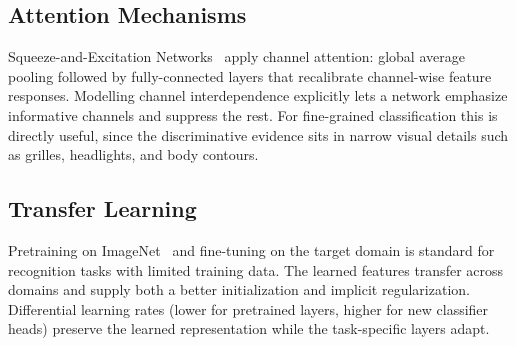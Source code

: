 \subsection{Attention Mechanisms}

Squeeze-and-Excitation Networks~\cite{Hu2018} apply channel attention: global average pooling followed by fully-connected layers that recalibrate channel-wise feature responses. Modelling channel interdependence explicitly lets a network emphasize informative channels and suppress the rest. For fine-grained classification this is directly useful, since the discriminative evidence sits in narrow visual details such as grilles, headlights, and body contours.

\subsection{Transfer Learning}

Pretraining on ImageNet~\cite{Deng2009} and fine-tuning on the target domain is standard for recognition tasks with limited training data. The learned features transfer across domains and supply both a better initialization and implicit regularization. Differential learning rates (lower for pretrained layers, higher for new classifier heads) preserve the learned representation while the task-specific layers adapt.
